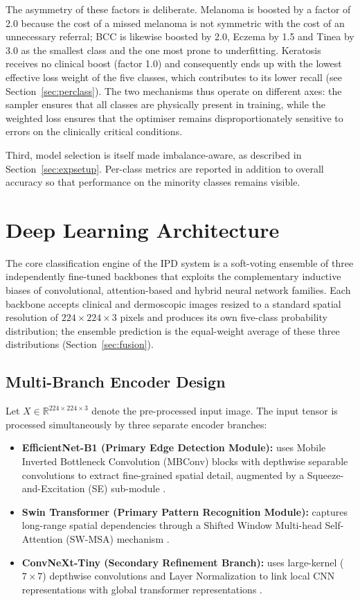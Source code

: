 \documentclass[pdflatex,sn-mathphys-num]{sn-jnl}%
\begin{document}
The asymmetry of these factors is deliberate. Melanoma is boosted by a factor of 2.0 because
the cost of a missed melanoma is not symmetric with the cost of an unnecessary referral;
BCC is likewise boosted by 2.0, Eczema by 1.5 and Tinea by 3.0 as the smallest class and
the one most prone to underfitting. Keratosis receives no clinical boost (factor 1.0) and
consequently ends up with the lowest effective loss weight of the five classes, which
contributes to its lower recall (see Section~\ref{sec:perclass}). The two mechanisms thus
operate on different axes: the sampler ensures that all classes are physically present in
training, while the weighted loss ensures that the optimiser remains disproportionately
sensitive to errors on the clinically critical conditions.

Third, model selection is itself made imbalance-aware, as described in
Section~\ref{sec:expsetup}. Per-class metrics are reported in addition to overall accuracy so
that performance on the minority classes remains visible.

\section{Deep Learning Architecture}\label{sec:dlarch}

The core classification engine of the IPD system is a soft-voting ensemble of three
independently fine-tuned backbones that exploits the complementary inductive biases of
convolutional, attention-based and hybrid neural network families. Each backbone accepts
clinical and dermoscopic images resized to a standard spatial resolution of
$224 \times 224 \times 3$ pixels and produces its own five-class probability distribution;
the ensemble prediction is the equal-weight average of these three distributions
(Section~\ref{sec:fusion}).

\subsection{Multi-Branch Encoder Design}\label{sec:encoder}

Let $X \in \mathbb{R}^{224 \times 224 \times 3}$ denote the pre-processed input image. The
input tensor is processed simultaneously by three separate encoder branches:

\begin{itemize}
\item \textbf{EfficientNet-B1 (Primary Edge Detection Module):} uses Mobile Inverted
Bottleneck Convolution (MBConv) blocks with depthwise separable convolutions to extract
fine-grained spatial detail, augmented by a Squeeze-and-Excitation (SE) sub-module
\cite{ref27}.
\item \textbf{Swin Transformer (Primary Pattern Recognition Module):} captures long-range
spatial dependencies through a Shifted Window Multi-head Self-Attention (SW-MSA) mechanism
\cite{ref11}.
\item \textbf{ConvNeXt-Tiny (Secondary Refinement Branch):} uses large-kernel ($7 \times 7$)
depthwise convolutions and Layer Normalization to link local CNN representations with global
transformer representations \cite{ref12}.
\end{itemize}
\end{document}
